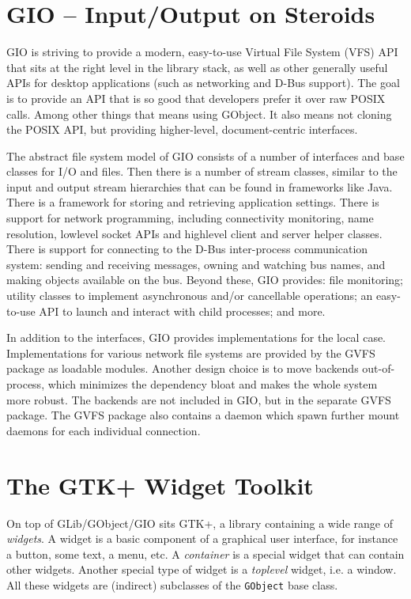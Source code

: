 \documentclass[a4paper,notumble]{leaflet}
\begin{document}
\section{GIO -- Input/Output on Steroids}

GIO is striving to provide a modern, easy-to-use Virtual File System (VFS) API that sits at the right level in the library stack, as well as other generally useful APIs for desktop applications (such as networking and D-Bus support). The goal is to provide an API that is so good that developers prefer it over raw POSIX calls. Among other things that means using GObject. It also means not cloning the POSIX API, but providing higher-level, document-centric interfaces.

The abstract file system model of GIO consists of a number of interfaces and base classes for I/O and files. Then there is a number of stream classes, similar to the input and output stream hierarchies that can be found in frameworks like Java. There is a framework for storing and retrieving application settings. There is support for network programming, including connectivity monitoring, name resolution, lowlevel socket APIs and highlevel client and server helper classes. There is support for connecting to the D-Bus inter-process communication system: sending and receiving messages, owning and watching bus names, and making objects available on the bus. Beyond these, GIO provides: file monitoring; utility classes to implement asynchronous and/or cancellable operations; an easy-to-use API to launch and interact with child processes; and more.

In addition to the interfaces, GIO provides implementations for the local case. Implementations for various network file systems are provided by the GVFS package as loadable modules. Another design choice is to move backends out-of-process, which minimizes the dependency bloat and makes the whole system more robust. The backends are not included in GIO, but in the separate GVFS package. The GVFS package also contains a daemon which spawn further mount daemons for each individual connection.

\section{The GTK+ Widget Toolkit}

On top of GLib/GObject/GIO sits GTK+, a library containing a wide range of \textit{widgets}. A widget is a basic component of a graphical user interface, for instance a button, some text, a menu, etc. A \textit{container} is a special widget that can contain other widgets. Another special type of widget is a \textit{toplevel} widget, i.e. a window. All these widgets are (indirect) subclasses of the \texttt{GObject} base class.
\end{document}
